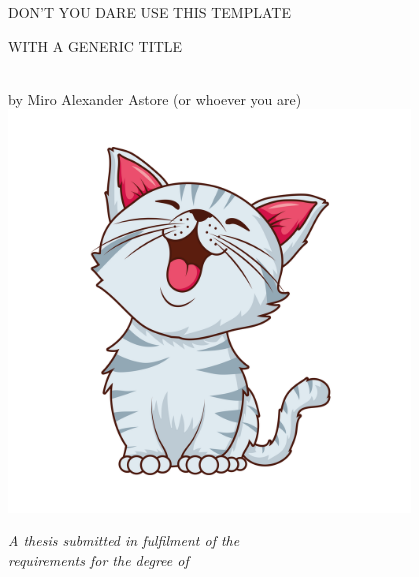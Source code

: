 
\begin{titlepage}

\begin{center}


\begin{LARGE}
DON'T YOU DARE USE THIS TEMPLATE  \\ 
\end{LARGE}
\vspace*{0.1in}
\begin{LARGE}
WITH A GENERIC TITLE
\end{LARGE}
\begin{large} \\
\vspace{0.1in}
by Miro Alexander Astore (or whoever you are)
\includegraphics[width=0.8\textwidth]{figures/title_image.jpg}

\textit{A thesis submitted in fulfilment of the}\\
\textit{requirements for the degree of}

\vspace{0.1in}


\end{large}
\end{center}
\end{titlepage}

